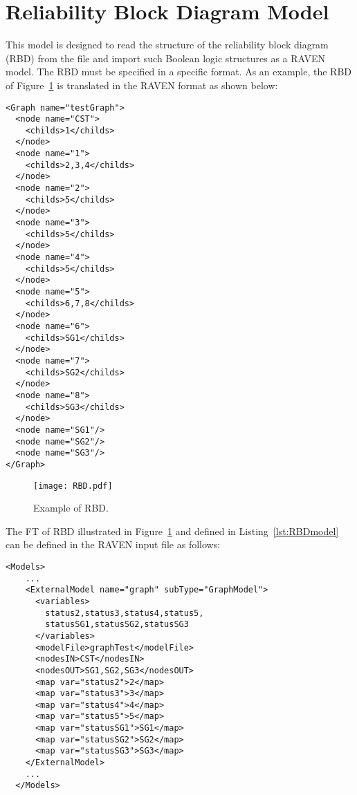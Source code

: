 \section{Reliability Block Diagram Model}
\label{sec:RBDmodel}

This model is designed to read the structure of the reliability block diagram (RBD) from
the file and import such Boolean logic structures as a RAVEN model.
The RBD must be specified in a specific format.
As an example, the RBD of Figure~\ref{fig:RBD} is translated in the RAVEN format as shown below:

\begin{lstlisting}[style=XML,morekeywords={anAttribute},caption=RBD input file., label=lst:RBDmodel]
<Graph name="testGraph">
  <node name="CST">
    <childs>1</childs>
  </node>
  <node name="1">
    <childs>2,3,4</childs>
  </node>
  <node name="2">
    <childs>5</childs>
  </node>
  <node name="3">
    <childs>5</childs>
  </node>
  <node name="4">
    <childs>5</childs>
  </node>
  <node name="5">
    <childs>6,7,8</childs>
  </node>
  <node name="6">
    <childs>SG1</childs>
  </node>
  <node name="7">
    <childs>SG2</childs>
  </node>
  <node name="8">
    <childs>SG3</childs>
  </node>
  <node name="SG1"/>
  <node name="SG2"/>
  <node name="SG3"/>
</Graph>
\end{lstlisting}

\begin{figure}
    \centering
    \centerline{\texttt{[image: RBD.pdf]}}
    \caption{Example of RBD.}
    \label{fig:RBD}
\end{figure}

The FT of RBD illustrated in Figure~\ref{fig:RBD} and defined in Listing~\ref{lst:RBDmodel}
can be defined in the RAVEN input file as follows:

\begin{lstlisting}[style=XML,morekeywords={anAttribute},caption=RBD model input example., label=lst:RBD_InputExample]
  <Models>
    ...
    <ExternalModel name="graph" subType="GraphModel">
      <variables>
        status2,status3,status4,status5,
        statusSG1,statusSG2,statusSG3
      </variables>
      <modelFile>graphTest</modelFile>
      <nodesIN>CST</nodesIN>
      <nodesOUT>SG1,SG2,SG3</nodesOUT>
      <map var="status2">2</map>
      <map var="status3">3</map>
      <map var="status4">4</map>
      <map var="status5">5</map>
      <map var="statusSG1">SG1</map>
      <map var="statusSG2">SG2</map>
      <map var="statusSG3">SG3</map>
    </ExternalModel>
    ...
  </Models>
\end{lstlisting}

